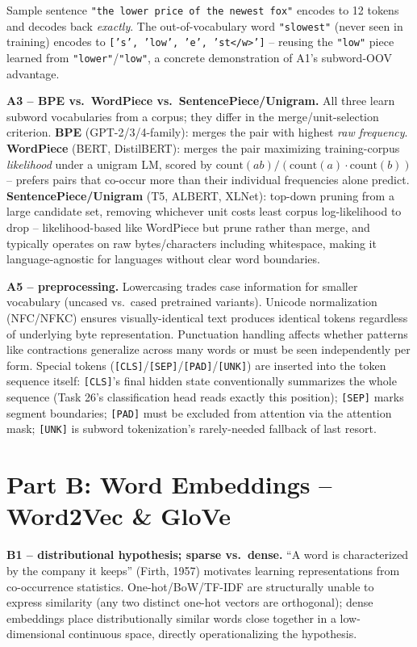 \documentclass[11pt,a4paper]{article}
\begin{document}
Sample sentence \texttt{"the lower price of the newest fox"} encodes to 12 tokens and decodes
back \emph{exactly}. The out-of-vocabulary word \texttt{"slowest"} (never seen in training)
encodes to \texttt{['s', 'low', 'e', 'st</w>']} -- reusing the \texttt{"low"} piece learned
from \texttt{"lower"}/\texttt{"low"}, a concrete demonstration of A1's subword-OOV advantage.

\textbf{A3 -- BPE vs.\ WordPiece vs.\ SentencePiece/Unigram.} All three learn subword
vocabularies from a corpus; they differ in the merge/unit-selection criterion. \textbf{BPE}
(GPT-2/3/4-family): merges the pair with highest \emph{raw frequency}. \textbf{WordPiece}
(BERT, DistilBERT): merges the pair maximizing training-corpus \emph{likelihood} under a
unigram LM, scored by $\text{count}(ab)/(\text{count}(a)\cdot\text{count}(b))$ -- prefers
pairs that co-occur more than their individual frequencies alone predict.
\textbf{SentencePiece/Unigram} (T5, ALBERT, XLNet): top-down pruning from a large candidate
set, removing whichever unit costs least corpus log-likelihood to drop -- likelihood-based
like WordPiece but prune rather than merge, and typically operates on raw bytes/characters
including whitespace, making it language-agnostic for languages without clear word
boundaries.

\textbf{A5 -- preprocessing.} Lowercasing trades case information for smaller vocabulary
(uncased vs.\ cased pretrained variants). Unicode normalization (NFC/NFKC) ensures
visually-identical text produces identical tokens regardless of underlying byte
representation. Punctuation handling affects whether patterns like contractions generalize
across many words or must be seen independently per form. Special tokens
(\texttt{[CLS]}/\texttt{[SEP]}/\texttt{[PAD]}/\texttt{[UNK]}) are inserted into the token
sequence itself: \texttt{[CLS]}'s final hidden state conventionally summarizes the whole
sequence (Task 26's classification head reads exactly this position); \texttt{[SEP]} marks
segment boundaries; \texttt{[PAD]} must be excluded from attention via the attention mask;
\texttt{[UNK]} is subword tokenization's rarely-needed fallback of last resort.

\section*{Part B: Word Embeddings -- Word2Vec \& GloVe}

\textbf{B1 -- distributional hypothesis; sparse vs.\ dense.} ``A word is characterized by the
company it keeps'' (Firth, 1957) motivates learning representations from co-occurrence
statistics. One-hot/BoW/TF-IDF are structurally unable to express similarity (any two
distinct one-hot vectors are orthogonal); dense embeddings place distributionally similar
words close together in a low-dimensional continuous space, directly operationalizing the
hypothesis.
\end{document}
